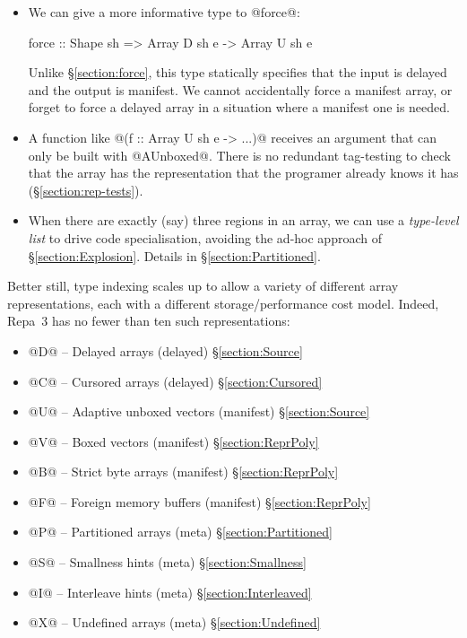 \begin{itemize}
\item We can give a more informative type to @force@:
\begin{small}
\begin{code}
 force :: Shape sh => Array D sh e -> Array U sh e
\end{code}
\end{small}
Unlike \S\ref{section:force}, this type statically specifies that the input is delayed and the output is manifest. We cannot accidentally force a manifest array, or forget to force a delayed array in a situation where a manifest one is needed.

\item A function like @(f :: Array U sh e -> ...)@ receives an argument that can only be built with @AUnboxed@. There is no redundant tag-testing to check that the array has the representation that the programer already knows it has (\S\ref{section:rep-tests}).

\item When there are exactly (say) three regions in an array, we can use a \emph{type-level list} to drive code specialisation, avoiding the ad-hoc approach of \S\ref{section:Explosion}.  Details in \S\ref{section:Partitioned}.
\end{itemize}
Better still, type indexing scales up to allow a variety of different array representations, each with a different storage/performance cost model. Indeed, Repa~3 has no fewer than ten such representations:
\begin{itemize}
\item @D@ -- Delayed arrays (delayed)            \S\ref{section:Source}
\item @C@ -- Cursored arrays (delayed)           \S\ref{section:Cursored}
\item @U@ -- Adaptive unboxed vectors (manifest) \S\ref{section:Source}
\item @V@ -- Boxed vectors (manifest)            \S\ref{section:ReprPoly}
\item @B@ -- Strict byte arrays (manifest)       \S\ref{section:ReprPoly}
\item @F@ -- Foreign memory buffers (manifest)   \S\ref{section:ReprPoly}
\item @P@ -- Partitioned arrays (meta)           \S\ref{section:Partitioned}
\item @S@ -- Smallness hints (meta)              \S\ref{section:Smallness}
\item @I@ -- Interleave hints (meta)             \S\ref{section:Interleaved}
\item @X@ -- Undefined arrays (meta)             \S\ref{section:Undefined}
\end{itemize}

